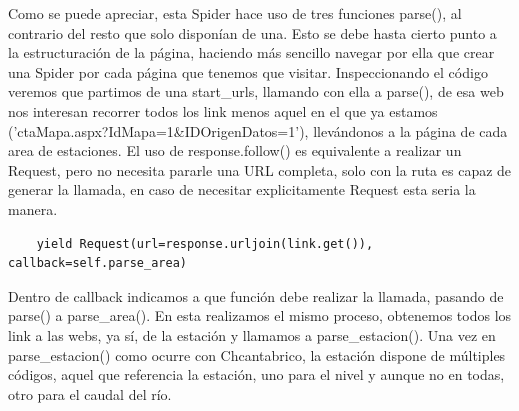 Como se puede apreciar, esta Spider hace uso de tres funciones parse(), al contrario del resto que solo disponían de una. Esto se debe hasta cierto punto a la estructuración de la página, haciendo más sencillo navegar por ella que crear una Spider por cada página que tenemos que visitar.\newline
\newline
Inspeccionando el código veremos que partimos de una start\_urls, llamando con ella a parse(), de esa web nos interesan recorrer todos los link menos aquel en el que ya estamos ('ctaMapa.aspx?IdMapa=1\&IDOrigenDatos=1'), llevándonos a la página de cada area de estaciones. El uso de response.follow() es equivalente a realizar un Request, pero no necesita pararle una URL completa, solo con la ruta es capaz de generar la llamada, en caso de necesitar explicitamente Request esta seria la manera.
\begin{verbatim}
	yield Request(url=response.urljoin(link.get()), callback=self.parse_area)
\end{verbatim}
Dentro de callback indicamos a que función debe realizar la llamada, pasando de parse() a parse\_area(). En esta realizamos el mismo proceso, obtenemos todos los link a las webs, ya sí, de la estación y llamamos a parse\_estacion().\newline
\newline
Una vez en parse\_estacion() como ocurre con Chcantabrico, la estación dispone de múltiples códigos, aquel que referencia la estación, uno para el nivel y aunque no en todas, otro para el caudal del río.

